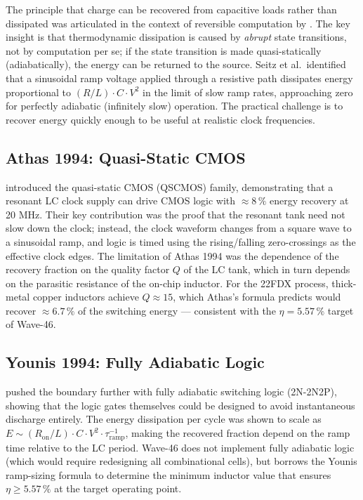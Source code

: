 The principle that charge can be recovered from capacitive loads rather than
dissipated was articulated in the context of reversible computation by
\citep{seitz_vlsi_1985}.
The key insight is that thermodynamic dissipation is caused by \emph{abrupt}
state transitions, not by computation per se; if the state transition is made
quasi-statically (adiabatically), the energy can be returned to the source.
Seitz et al.\ identified that a sinusoidal ramp voltage applied through a
resistive path dissipates energy proportional to $(R/L) \cdot C \cdot V^{2}$
in the limit of slow ramp rates, approaching zero for perfectly adiabatic
(infinitely slow) operation.
The practical challenge is to recover energy quickly enough to be useful at
realistic clock frequencies.

\subsection{Athas 1994: Quasi-Static CMOS}

\citep{athas_vlsi_1994} introduced the quasi-static CMOS (QSCMOS) family,
demonstrating that a resonant LC clock supply can drive CMOS logic with
$\approx 8\,\%$ energy recovery at 20 MHz.
Their key contribution was the proof that the resonant tank need not slow down
the clock; instead, the clock waveform changes from a square wave to a
sinusoidal ramp, and logic is timed using the rising/falling zero-crossings
as the effective clock edges.
The limitation of Athas 1994 was the dependence of the recovery fraction on the
quality factor $Q$ of the LC tank, which in turn depends on the parasitic
resistance of the on-chip inductor.
For the 22FDX process, thick-metal copper inductors achieve $Q \approx 15$,
which Athas's formula predicts would recover $\approx 6.7\,\%$ of the switching
energy — consistent with the $\eta = 5.57\,\%$ target of Wave-46.

\subsection{Younis 1994: Fully Adiabatic Logic}

\citep{younis_vlsi_1994} pushed the boundary further with fully adiabatic
switching logic (2N-2N2P), showing that the logic gates themselves could be
designed to avoid instantaneous discharge entirely.
The energy dissipation per cycle was shown to scale as
$E \sim (R_{\mathrm{on}} / L) \cdot C \cdot V^{2} \cdot \tau_{\mathrm{ramp}}^{-1}$,
making the recovered fraction depend on the ramp time relative to the LC period.
Wave-46 does not implement fully adiabatic logic (which would require redesigning
all combinational cells), but borrows the Younis ramp-sizing formula to determine
the minimum inductor value that ensures $\eta \geq 5.57\,\%$ at the
target operating point.

